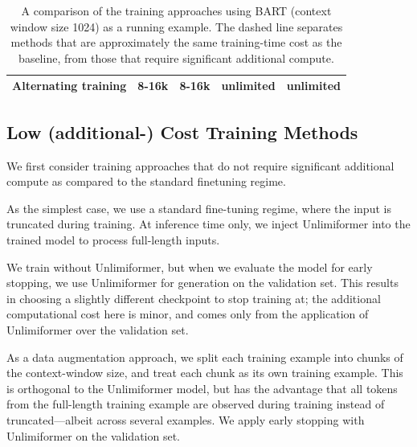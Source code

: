 \documentclass{article}
\newcommand{\ours}{Unlimiformer\xspace}
\begin{document}
\begin{table}[h]
{\begin{tabular}{lllll}
Alternating training               & 8-16k               & 8-16k                                                                                          & unlimited                                                                             & unlimited    \\  
\bottomrule
\end{tabular} }
\caption{A comparison of the training approaches using BART (context window size 1024) as a running example. The dashed line separates methods that are approximately the same training-time cost as the baseline, from those that require significant additional compute.}
\label{tab:methodology-comp}
\end{table}

\subsection{Low (additional-) Cost Training Methods}
We first consider training approaches that do not require significant additional compute as compared to the standard finetuning regime.
\begin{description}[noitemsep]

\item[\textit{+test \ours:}] As the simplest case, we use a standard fine-tuning regime, where the input is truncated during training. At inference time only, we inject \ours into the trained model to process full-length inputs.

\item[\textit{+early stop w/ \ours:}] We train without \ours, but when we evaluate the model for early stopping, we use \ours for generation on the validation set. This results in choosing a slightly different checkpoint to stop training at; the additional computational cost here is minor, and comes only from the application of \ours 
over the validation set. 

\item[\textit{Train chunked +test \ours:}] 
As a data augmentation approach, we split each training example into chunks of the context-window size, and treat each chunk as its own training example. 
This is orthogonal to the \ours{} model, but has the advantage that 
all tokens from the full-length training example are observed during training
instead of truncated---albeit across several  examples. We apply early stopping with \ours on the validation set.

\end{description}
\end{document}
